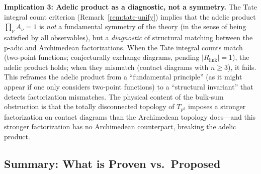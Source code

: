 \documentclass[11pt,a4paper]{article}
\begin{document}
\textbf{Implication 3: Adelic product as a diagnostic, not a symmetry.} The Tate integral count criterion (Remark~\ref{rem:tate-unify}) implies that the adelic product $\prod_\nu A_\nu = 1$ is \emph{not} a fundamental symmetry of the theory (in the sense of being satisfied by all observables), but a \emph{diagnostic} of structural matching between the p-adic and Archimedean factorizations. When the Tate integral counts match (two-point functions; conjecturally exchange diagrams, pending $|R_{\mathrm{link}}| = 1$), the adelic product holds; when they mismatch (contact diagrams with $n \geq 3$), it fails. This reframes the adelic product from a ``fundamental principle'' (as it might appear if one only considers two-point functions) to a ``structural invariant'' that detects factorization mismatches. The physical content of the bulk-sum obstruction is that the totally disconnected topology of $T_{p^d}$ imposes a stronger factorization on contact diagrams than the Archimedean topology does---and this stronger factorization has no Archimedean counterpart, breaking the adelic product.

\subsection{Summary: What is Proven vs.\ Proposed}
\end{document}
